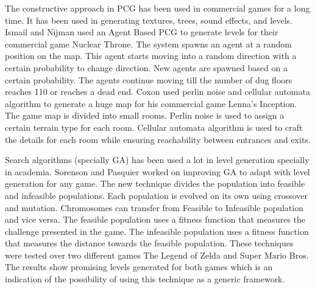 The constructive approach in PCG has been used in commercial games for a long time. It has been used in generating textures, trees, sound effects, and levels. Ismail and Nijman\cite{nuclearThrone} used an Agent Based PCG to generate levels for their commercial game Nuclear Throne. The system spawns an agent at a random position on the map. This agent starts moving into a random direction with a certain probability to change direction. New agents are spawned based on a certain probability. The agents continue moving till the number of dug floors reaches 110 or reaches a dead end. Coxon\cite{lennaInception} used perlin noise and cellular automata algorithm to generate a huge map for his commercial game Lenna's Inception. The game map is divided into small rooms. Perlin noise is used to assign a certain terrain type for each room. Cellular automata algorithm is used to craft the details for each room while ensuring reachability between entrances and exits.\\\par

Search algorithms (specially GA) has been used a lot in level generation specially in academia. Sorenson and Pasquier\cite{genericLevelFramework} worked on improving GA to adapt with level generation for any game. The new technique divides the population into feasible and infeasible populations. Each population is evolved on its own using crossover and mutation. Chromosomes can transfer from Feasible to Infeasible population and vice versa. The feasible population uses a fitness function that measures the challenge presented in the game. The infeasible population uses a fitness function that measures the distance towards the feasible population. These techniques were tested over two different games The Legend of Zelda and Super Mario Bros. The results show promising levels generated for both games which is an indication of the possibility of using this technique as a generic framework.\\\par

